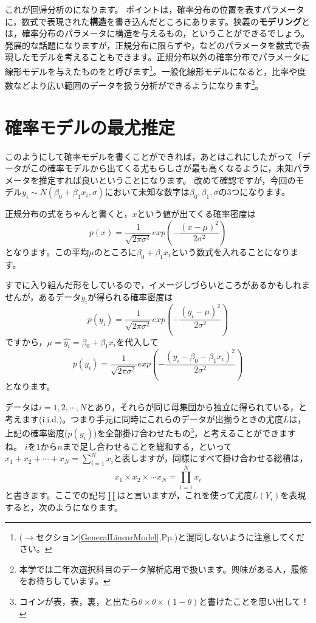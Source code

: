 \documentclass{ltjbook}
\begin{document}
これが回帰分析のになります。
ポイントは，確率分布の位置を表すパラメータに，数式で表現された\textbf{構造}を書き込んだところにあります。狭義の\textbf{モデリング}とは，確率分布のパラメータに構造を与えるもの，ということができるでしょう。
発展的な話題になりますが，正規分布に限らずや，などのパラメータを数式で表現したモデルを考えることもできます。正規分布以外の確率分布でパラメータに線形モデルを与えたものをと呼びます\footnote{($\to$セクション\ref{GeneralLinearModel},Pp.\pageref{GeneralLinearModel})と混同しないように注意してください。}。一般化線形モデルになると，比率や度数などより広い範囲のデータを扱う分析ができるようになります\footnote{本学では二年次選択科目のデータ解析応用で扱います。興味がある人，履修をお待ちしています。}。

\section{確率モデルの最尤推定}

このようにして確率モデルを書くことができれば，あとはこれにしたがって「データがこの確率モデルから出てくる尤もらしさが最も高くなるように，未知パラメータを推定すれば良いということになります。
改めて確認ですが，今回のモデル$y_i \sim N(\beta_0 + \beta_1x_i, \sigma)$において未知な数字は$\beta_0,\beta_1,\sigma$の3つになります。


正規分布の式をちゃんと書くと，$x$という値が出てくる確率密度は
\[ p(x) = \frac{1}{\sqrt{2\pi \sigma^2}}exp\left( - \frac{(x-\mu)^2}{2\sigma^2}\right)\]
となります。この平均$\mu$のところに$\beta_0 + \beta_1 x_i$という数式を入れることになります。

すでに入り組んだ形をしているので，イメージしづらいところがあるかもしれませんが，あるデータ$y_i$が得られる確率密度は
\[ p(y_i) = \frac{1}{\sqrt{2\pi \sigma^2}}exp\left( -\frac{(y_i-\mu)^2}{2\sigma^2}\right)\]
ですから，$\mu=\hat{y_i} = \beta_0 + \beta_1 x_i$を代入して
\[ p(y_i) = \frac{1}{\sqrt{2\pi \sigma^2}}exp\left( -\frac{(y_i-\beta_0 - \beta_1 x_i)^2}{2\sigma^2}\right)\]
となります。

データは$i = 1,2,\cdots,N$とあり，それらが同じ母集団から独立に得られている，と考えます(i.i.d.)。つまり手元に同時にこれらのデータが出揃うときの尤度$L$は，上記の確率密度($p(y_i)$)を全部掛け合わせたもの\footnote{コインが表，表，裏，と出たら$\theta \times \theta \times (1-\theta)$と書けたことを思い出して！}，と考えることができますね。
$i$を$1$から$n$まで足し合わせることを総和する，といって$x_1+x_2+\cdots+x_N=\sum_{i=1}^N x_i$と表しますが，同様にすべて掛け合わせる総積は，
\[ x_1 \times x_2 \times \cdots x_N = \prod_{i=1}^N x_i \]
と書きます。ここでの記号$\prod$はと言いますが，これを使って尤度$L(Y_i)$を表現すると，次のようになります。
\end{document}
